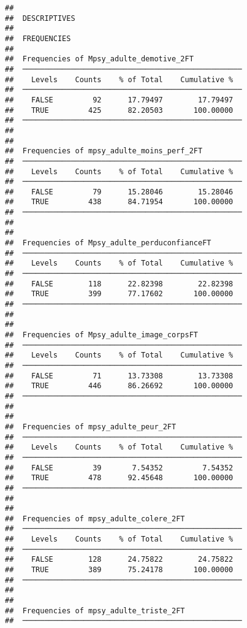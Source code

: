 \documentclass[
]{article}
\begin{document}
\begin{verbatim}
## 
##  DESCRIPTIVES
## 
##  FREQUENCIES
## 
##  Frequencies of Mpsy_adulte_demotive_2FT            
##  ────────────────────────────────────────────────── 
##    Levels    Counts    % of Total    Cumulative %   
##  ────────────────────────────────────────────────── 
##    FALSE         92      17.79497        17.79497   
##    TRUE         425      82.20503       100.00000   
##  ────────────────────────────────────────────────── 
## 
## 
##  Frequencies of mpsy_adulte_moins_perf_2FT          
##  ────────────────────────────────────────────────── 
##    Levels    Counts    % of Total    Cumulative %   
##  ────────────────────────────────────────────────── 
##    FALSE         79      15.28046        15.28046   
##    TRUE         438      84.71954       100.00000   
##  ────────────────────────────────────────────────── 
## 
## 
##  Frequencies of Mpsy_adulte_perduconfianceFT        
##  ────────────────────────────────────────────────── 
##    Levels    Counts    % of Total    Cumulative %   
##  ────────────────────────────────────────────────── 
##    FALSE        118      22.82398        22.82398   
##    TRUE         399      77.17602       100.00000   
##  ────────────────────────────────────────────────── 
## 
## 
##  Frequencies of Mpsy_adulte_image_corpsFT           
##  ────────────────────────────────────────────────── 
##    Levels    Counts    % of Total    Cumulative %   
##  ────────────────────────────────────────────────── 
##    FALSE         71      13.73308        13.73308   
##    TRUE         446      86.26692       100.00000   
##  ────────────────────────────────────────────────── 
## 
## 
##  Frequencies of mpsy_adulte_peur_2FT                
##  ────────────────────────────────────────────────── 
##    Levels    Counts    % of Total    Cumulative %   
##  ────────────────────────────────────────────────── 
##    FALSE         39       7.54352         7.54352   
##    TRUE         478      92.45648       100.00000   
##  ────────────────────────────────────────────────── 
## 
## 
##  Frequencies of mpsy_adulte_colere_2FT              
##  ────────────────────────────────────────────────── 
##    Levels    Counts    % of Total    Cumulative %   
##  ────────────────────────────────────────────────── 
##    FALSE        128      24.75822        24.75822   
##    TRUE         389      75.24178       100.00000   
##  ────────────────────────────────────────────────── 
## 
## 
##  Frequencies of mpsy_adulte_triste_2FT              
##  ────────────────────────────────────────────────── 

\end{verbatim}
\end{document}
